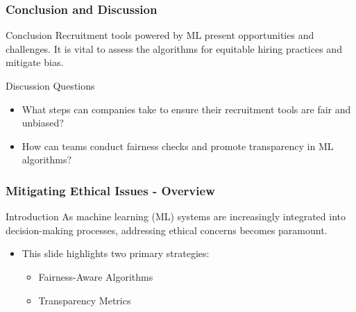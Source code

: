 \documentclass[aspectratio=169]{beamer}
\begin{document}
\begin{frame}[fragile]
    \frametitle{Conclusion and Discussion}
    \begin{block}{Conclusion}
        Recruitment tools powered by ML present opportunities and challenges. It is vital to assess the algorithms for equitable hiring practices and mitigate bias.
    \end{block}
    \begin{block}{Discussion Questions}
        \begin{itemize}
            \item What steps can companies take to ensure their recruitment tools are fair and unbiased?
            \item How can teams conduct fairness checks and promote transparency in ML algorithms?
        \end{itemize}
    \end{block}
\end{frame}

\begin{frame}[fragile]
    \frametitle{Mitigating Ethical Issues - Overview}
    \begin{block}{Introduction}
        As machine learning (ML) systems are increasingly integrated into decision-making processes, addressing ethical concerns becomes paramount. 
    \end{block}
    \begin{itemize}
        \item This slide highlights two primary strategies:
        \begin{itemize}
            \item Fairness-Aware Algorithms
            \item Transparency Metrics
        \end{itemize}
    \end{itemize}
\end{frame}
\end{document}
